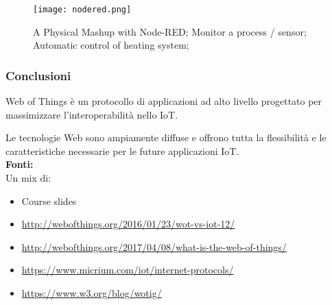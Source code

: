 \begin{figure}[H]
  \centering
  \texttt{[image: nodered.png]}
  \caption{A Physical Mashup with Node-RED;
Monitor a process / sensor;
Automatic control of heating system;}
  \label{fig:nodered}
\end{figure}

\subsubsection{Conclusioni}

Web of Things è un protocollo di applicazioni ad alto livello progettato per
massimizzare l'interoperabilità nello IoT.

Le tecnologie Web sono ampiamente diffuse e offrono tutta la flessibilità e le
caratteristiche necessarie per le future applicazioni IoT. \\

\textbf{Fonti:}\\

Un mix di:

\begin{itemize}
  \item Course slides
  \item \url{http://webofthings.org/2016/01/23/wot-vs-iot-12/}
  \item \url{http://webofthings.org/2017/04/08/what-is-the-web-of-things/}
  \item \url{https://www.micrium.com/iot/internet-protocols/}
  \item \url{https://www.w3.org/blog/wotig/}
\end{itemize}
